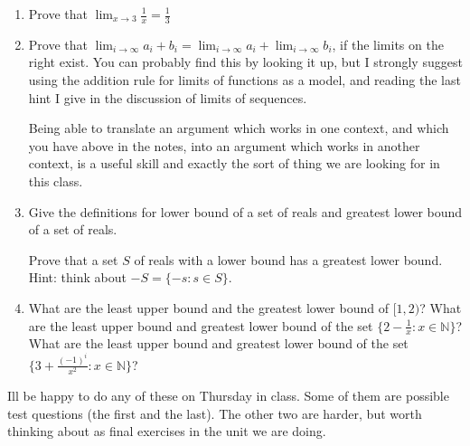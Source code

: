 \documentclass[12pt]{article}
\begin{document}
\begin{enumerate}

\item Prove that $\lim_{x \rightarrow 3}\frac 1x = \frac 13$

\item Prove that $\lim_{i \rightarrow \infty} a_i + b_i = \lim_{i \rightarrow \infty} a_i + \lim_{i \rightarrow \infty}  b_i$, if the limits on the right exist.   You can probably find this by looking it up, but I strongly suggest using the addition rule for limits of functions as a model, and reading the last hint I give in the discussion of limits of sequences.

Being able to translate an argument which works in one context, and which you have above in the notes, into an argument which works in another context, is a useful skill and exactly the sort of thing we are looking for in this class.

\item  Give the definitions for lower bound of a set of reals and greatest lower bound of a set of reals.

Prove that a set $S$ of reals with a lower bound has a greatest lower bound.  Hint:  think about $-S = \{-s:s \in S\}$.

\item  What are the least upper bound and the greatest lower bound of $[1,2)$?  What are the least upper bound and greatest lower bound of the set $\{2-\frac1x:x \in \mathbb N\}$?  What are the least upper bound and greatest lower bound of the set
$\{3 + \frac{(-1)^i}{x^2}:x \in \mathbb N\}$?

\end{enumerate}

Ill be happy to do any of these on Thursday in class.  Some of them are possible test questions (the first and the last).  The other two are harder, but worth thinking about as final exercises in the unit we are doing.
\end{document}
